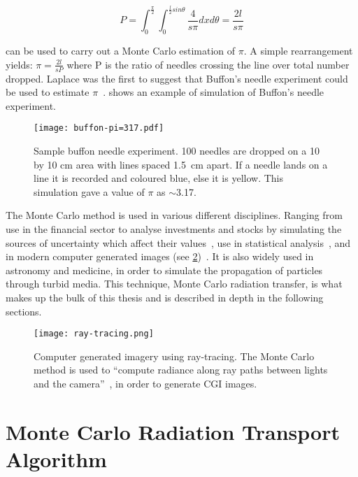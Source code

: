 \begin{equation}
P=\int_0^{\frac{\pi}{2}}\int_0^{\frac{l}{2}sin\theta}\frac{4}{s\pi}dx d\theta = \frac{2 l}{s \pi}\label{eqn:buffon}
\end{equation}


 can be used to carry out a Monte Carlo estimation of $\pi$. A simple rearrangement yields: $\pi = \tfrac{2l}{sP}$ where P is the ratio of needles crossing the line over total number dropped. Laplace was the first to suggest that Buffon's needle experiment could be used to estimate $\pi$~\cite{beckmann2015history}.  shows an example of simulation of Buffon's needle experiment.

\begin{figure}[!htb]
\centering
\texttt{[image: buffon-pi=317.pdf]}
\caption{Sample buffon needle experiment. 100 needles are dropped on a 10 by 10 cm area with lines spaced 1.5~cm apart. If a needle lands on a line it is recorded and coloured blue, else it is yellow. This simulation gave a value of $\pi$ as $\sim$3.17.}
\label{fig:buffon-needle}
\end{figure}

The Monte Carlo method is used in various different disciplines. Ranging from use in the financial sector to analyse investments and stocks by simulating the sources of uncertainty which affect their values~\cite{jackel2002monte,finaceprrof}, use in statistical analysis~\cite{wall2012practical}, and in modern computer generated images (see \cref{fig:ray-trace})~\cite{Kajiyarendering,Cookraytracing}. It is also widely used in astronomy and medicine, in order to simulate the propagation of particles through turbid media. This technique, Monte Carlo radiation transfer, is what makes up the bulk of this thesis and is described in depth in the following sections.

\begin{figure}[!htb]
\centering
\texttt{[image: ray-tracing.png]}
\caption{Computer generated imagery using ray-tracing. The Monte Carlo method is used to ``compute radiance along ray paths between lights and the camera''~\cite{pharr2016physically}, in order to generate CGI images.}
\label{fig:ray-trace}
\end{figure}

\section{Monte Carlo Radiation Transport Algorithm}

